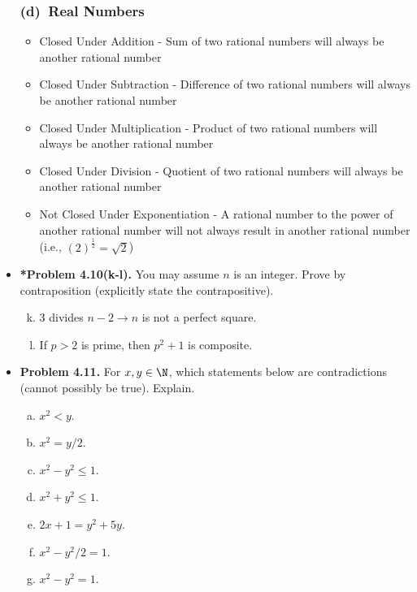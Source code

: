 \documentclass[11pt]{article}
\def\imp{\rightarrow}
\begin{document}
\begin{itemize}
  \subsubsection*{(d)~Real Numbers}
  \begin{itemize}
    \item Closed Under Addition - Sum of two rational numbers will always be another rational number
    \item Closed Under Subtraction - Difference of two rational numbers will always be another rational number
    \item Closed Under Multiplication - Product of two rational numbers will always be another rational number 
    \item Closed Under Division - Quotient of two rational numbers will always be another rational number
    \item Not Closed Under Exponentiation - A rational number to the power of another rational number will not always result in another rational number (i.e., \(\left(2\right)^{\frac{1}{2}} = \sqrt{2}\))
  \end{itemize}

\vspace{0.1in}

\item \textbf{*Problem 4.10(k-l).}
  You may assume $n$ is an integer.
  Prove by contraposition (explicitly state the contrapositive).
  \begin{enumerate}[(a)]
  \setcounter{enumi}{10}
  \item 3 divides $n-2\imp n$ is not a perfect square.
  \item If $p>2$ is prime, then $p^2+1$ is composite.
  \end{enumerate}

\vspace{0.1in}

\item \textbf{Problem 4.11.}
  For $x,y\in\N$, which statements below are contradictions (cannot possibly be true).
  Explain.
  \begin{enumerate}[(a)]
  \item $x^2<y$.
  \item $x^2=y/2$.
  \item $x^2-y^2\le 1$.
  \item $x^2+y^2\le 1$.
  \item $2x+1=y^2+5y$.
  \item $x^2-y^2/2=1$.
  \item $x^2-y^2=1$.
  \end{enumerate}


\end{itemize}
\end{document}
